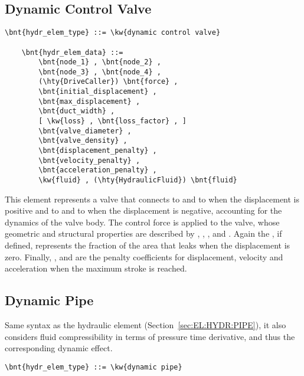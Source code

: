 \subsection{Dynamic Control Valve}
\label{sec:EL:HYDR:DYNAMIC_CONTROL_VALVE}
\begin{Verbatim}[commandchars=\\\{\}]
    \bnt{hydr_elem_type} ::= \kw{dynamic control valve}

    \bnt{hydr_elem_data} ::=
        \bnt{node_1} , \bnt{node_2} ,
        \bnt{node_3} , \bnt{node_4} ,
        (\hty{DriveCaller}) \bnt{force} ,
        \bnt{initial_displacement} ,
        \bnt{max_displacement} ,
        \bnt{duct_width} ,
        [ \kw{loss} , \bnt{loss_factor} , ]
        \bnt{valve_diameter} ,
        \bnt{valve_density} ,
        \bnt{displacement_penalty} ,
        \bnt{velocity_penalty} ,
        \bnt{acceleration_penalty} ,
        \kw{fluid} , (\hty{HydraulicFluid}) \bnt{fluid}
\end{Verbatim}
This element represents a valve that connects
 to  and  to 
when the displacement is positive and  to 
and  to  when the displacement is negative,
accounting for the dynamics of the valve body.
The control force  is applied to the valve, whose 
geometric and structural properties are described by 
, ,
,  and .
Again the , if defined, represents the fraction
of the area that leaks when the displacement is zero.
Finally, ,  and 
are the penalty coefficients for displacement, velocity and acceleration
when the maximum stroke is reached.




\subsection{Dynamic Pipe}
\label{sec:EL:HYDR:DYNAMIC_PIPE}
Same syntax as the  hydraulic element
(Section~\ref{sec:EL:HYDR:PIPE}),
it also considers fluid compressibility in terms of pressure time derivative,
and thus the corresponding dynamic effect.
\begin{Verbatim}[commandchars=\\\{\}]
    \bnt{hydr_elem_type} ::= \kw{dynamic pipe}
\end{Verbatim}

